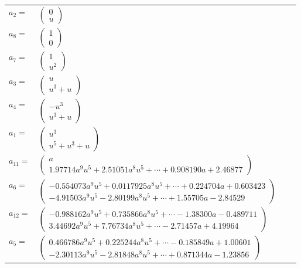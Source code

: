\documentclass[1p]{elsarticle_modified}
\theoremstyle{definition}
\begin{document}
\begin{tabular}{m{7pt} m{180pt} m{7pt} m{180pt} }
\flushright $a_{2}=$&$\begin{pmatrix}0\\u\end{pmatrix}$ \\
\flushright $a_{8}=$&$\begin{pmatrix}1\\0\end{pmatrix}$ \\
\flushright $a_{7}=$&$\begin{pmatrix}1\\u^2\end{pmatrix}$ \\
\flushright $a_{3}=$&$\begin{pmatrix}u\\u^3+u\end{pmatrix}$ \\
\flushright $a_{4}=$&$\begin{pmatrix}- u^3\\u^3+u\end{pmatrix}$ \\
\flushright $a_{1}=$&$\begin{pmatrix}u^3\\u^5+u^3+u\end{pmatrix}$ \\
\flushright $a_{11}=$&$\begin{pmatrix}a\\1.97714 a^{9} u^{5}+2.51051 a^{8} u^{5}+\cdots+0.908190 a+2.46877\end{pmatrix}$ \\
\flushright $a_{6}=$&$\begin{pmatrix}-0.554073 a^{9} u^{5}+0.0117925 a^{8} u^{5}+\cdots+0.224704 a+0.603423\\-4.91503 a^{9} u^{5}-2.80199 a^{8} u^{5}+\cdots+1.55705 a-2.84529\end{pmatrix}$ \\
\flushright $a_{12}=$&$\begin{pmatrix}-0.988162 a^{9} u^{5}+0.735866 a^{8} u^{5}+\cdots-1.38300 a-0.489711\\3.44692 a^{9} u^{5}+7.76734 a^{8} u^{5}+\cdots-2.71457 a+4.19964\end{pmatrix}$ \\
\flushright $a_{5}=$&$\begin{pmatrix}0.466786 a^{9} u^{5}+0.225244 a^{8} u^{5}+\cdots-0.185849 a+1.00601\\-2.30113 a^{9} u^{5}-2.81848 a^{8} u^{5}+\cdots+0.871344 a-1.23856\end{pmatrix}$ \\

\end{tabular}
\end{document}
